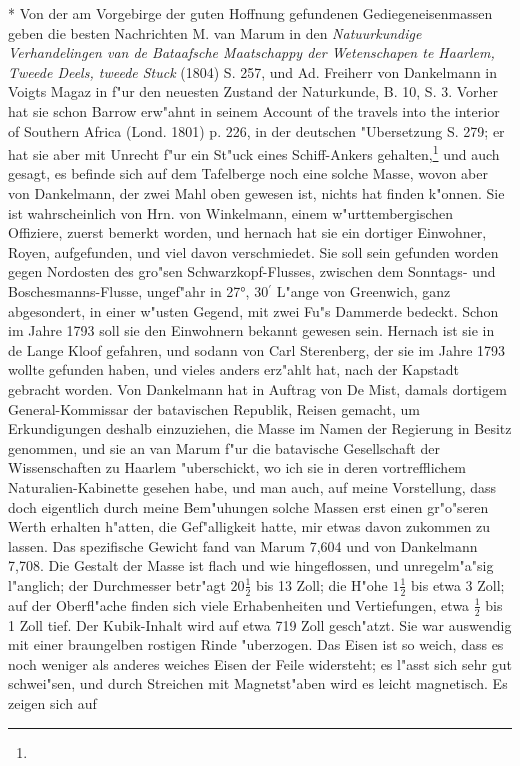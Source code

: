\documentclass[a4paper, 11pt, oneside, polutonikogreek, german]{article}
\begin{document}
* Von der am Vorgebirge der guten Hoffnung gefundenen Gediegeneisenmassen geben die besten Nachrichten M. van Marum in den \emph{Natuurkundige Verhandelingen van de Bataafsche Maatschappy der Wetenschapen te Haarlem, Tweede Deels, tweede Stuck} (1804) S. 257, und Ad. Freiherr von Dankelmann in Voigts Magaz in f"ur den neuesten Zustand der Naturkunde, B. 10, S. 3. Vorher hat sie schon Barrow erw"ahnt in seinem Account of the travels into the interior of Southern Africa (Lond. 1801) p. 226, in der deutschen "Ubersetzung S. 279; er hat sie aber mit Unrecht f"ur ein St"uck eines Schiff-Ankers gehalten,\footnote{} und auch gesagt, es befinde sich auf dem Tafelberge noch eine solche Masse, wovon aber von Dankelmann, der zwei Mahl oben gewesen ist, nichts hat finden k"onnen. Sie ist wahrscheinlich von Hrn. von Winkelmann, einem w"urttembergischen Offiziere, zuerst bemerkt worden, und hernach hat sie ein dortiger Einwohner, Royen, aufgefunden, und viel davon verschmiedet. Sie soll sein gefunden worden gegen Nordosten des gro"sen Schwarzkopf-Flusses, zwischen dem Sonntags- und Boschesmanns-Flusse, ungef"ahr in 27°, 30$^{\prime}$ L"ange von Greenwich, ganz abgesondert, in einer w"usten Gegend, mit zwei Fu"s Dammerde bedeckt. Schon im Jahre 1793 soll sie den Einwohnern bekannt gewesen sein. Hernach ist sie in de Lange Kloof gefahren, und sodann von Carl Sterenberg, der sie im Jahre 1793 wollte gefunden haben, und vieles anders erz"ahlt hat, nach der Kapstadt gebracht worden. Von Dankelmann hat in Auftrag von De Mist, damals dortigem General-Kommissar der batavischen Republik, Reisen gemacht, um Erkundigungen deshalb einzuziehen, die Masse im Namen der Regierung in Besitz genommen, und sie an van Marum f"ur die batavische Gesellschaft der Wissenschaften zu Haarlem "uberschickt, wo ich sie in deren vortrefflichem Naturalien-Kabinette gesehen habe, und man auch, auf meine Vorstellung, dass doch eigentlich durch meine Bem"uhungen solche Massen erst einen gr"o"seren Werth erhalten h"atten, die Gef"alligkeit hatte, mir etwas davon zukommen zu lassen. Das spezifische Gewicht fand van Marum 7,604 und von Dankelmann 7,708. Die Gestalt der Masse ist flach und wie hingeflossen, und unregelm"a"sig l"anglich; der Durchmesser betr"agt $\mathfrak{20\frac{1}{2}}$ bis 13 Zoll; die H"ohe $\mathfrak{1\frac{1}{2}}$ bis etwa 3 Zoll; auf der Oberfl"ache finden sich viele Erhabenheiten und Vertiefungen, etwa $\mathfrak{\frac{1}{2}}$ bis 1 Zoll tief. Der Kubik-Inhalt wird auf etwa 719 Zoll gesch"atzt. Sie war auswendig mit einer braungelben rostigen Rinde "uberzogen. Das Eisen ist so weich, dass es noch weniger als anderes weiches Eisen der Feile widersteht; es l"asst sich sehr gut schwei"sen, und durch Streichen mit Magnetst"aben wird es leicht magnetisch. Es zeigen sich auf 
\end{document}
